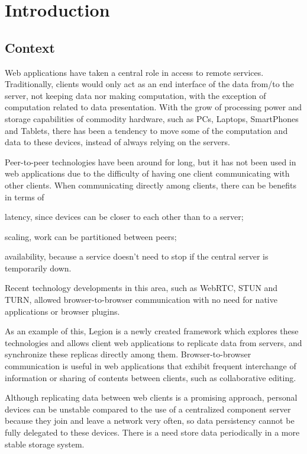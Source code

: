 \chapter{Introduction}
\label{cha:introduction}

\section{Context}
\label{sec:context}
Web applications have taken a central role in access to remote services. Traditionally, clients would only act as an end interface of the data from/to the server, not keeping data nor making computation, with the exception of computation related to data presentation. With the grow of processing power and storage capabilities of commodity hardware, such as PCs, Laptops, SmartPhones and Tablets, there has been a tendency to move some of the computation and data to these devices, instead of always relying on the servers.\par
	Peer-to-peer technologies have been around for long, but it has not been used in web applications due to the difficulty of having one client communicating with other clients. When communicating directly among clients, there can be benefits in terms of \begin{enumerate*}[(i)]
	\item latency, since devices can be closer to each other than to a server;
	\item scaling, work can be partitioned between peers;
	\item availability, because a service doesn't need to stop if the central server is temporarily down.\end{enumerate*}
Recent technology developments in this area, such as WebRTC, STUN and TURN, allowed  browser-to-browser communication with no need for native applications or browser plugins.\par
	As an example of this, Legion is a newly created framework which explores these technologies and allows client web applications to replicate data from servers, and synchronize these replicas directly among them. Browser-to-browser communication is useful in web applications that exhibit frequent interchange of information or sharing of contents between clients, such as collaborative editing.\par
	Although replicating data between web clients is a promising approach, personal devices can be unstable compared to the use of a centralized component server because they join and leave a network very often, so data persistency cannot be fully delegated to these devices. There is a need store data periodically in a more stable storage system.

